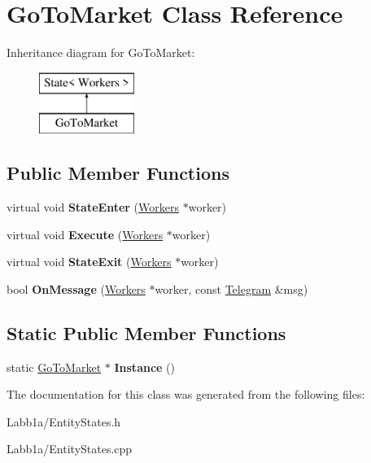 \hypertarget{class_go_to_market}{}\section{Go\+To\+Market Class Reference}
\label{class_go_to_market}
Inheritance diagram for Go\+To\+Market\+:\begin{figure}[H]
\begin{center}
\leavevmode
\includegraphics[height=2.000000cm]{class_go_to_market}
\end{center}
\end{figure}
\subsection*{Public Member Functions}
\begin{DoxyCompactItemize}
\item 
\hypertarget{class_go_to_market_a81aa2ce2930ff457c5ff2324f53cacaa}{}virtual void {\bfseries State\+Enter} (\hyperlink{class_workers}{Workers} $\ast$worker)\label{class_go_to_market_a81aa2ce2930ff457c5ff2324f53cacaa}

\item 
\hypertarget{class_go_to_market_a021b364ed9397c216a2dc99920cc19cb}{}virtual void {\bfseries Execute} (\hyperlink{class_workers}{Workers} $\ast$worker)\label{class_go_to_market_a021b364ed9397c216a2dc99920cc19cb}

\item 
\hypertarget{class_go_to_market_a386a2fed19e9c00504ebed3bbd5b8861}{}virtual void {\bfseries State\+Exit} (\hyperlink{class_workers}{Workers} $\ast$worker)\label{class_go_to_market_a386a2fed19e9c00504ebed3bbd5b8861}

\item 
\hypertarget{class_go_to_market_a81632944bc84023345834e24eb0498a2}{}bool {\bfseries On\+Message} (\hyperlink{class_workers}{Workers} $\ast$worker, const \hyperlink{struct_telegram}{Telegram} \&msg)\label{class_go_to_market_a81632944bc84023345834e24eb0498a2}

\end{DoxyCompactItemize}
\subsection*{Static Public Member Functions}
\begin{DoxyCompactItemize}
\item 
\hypertarget{class_go_to_market_ab105de7dc42a8b9a94fd0976995ce319}{}static \hyperlink{class_go_to_market}{Go\+To\+Market} $\ast$ {\bfseries Instance} ()\label{class_go_to_market_ab105de7dc42a8b9a94fd0976995ce319}

\end{DoxyCompactItemize}


The documentation for this class was generated from the following files\+:\begin{DoxyCompactItemize}
\item 
Labb1a/Entity\+States.\+h\item 
Labb1a/Entity\+States.\+cpp\end{DoxyCompactItemize}
